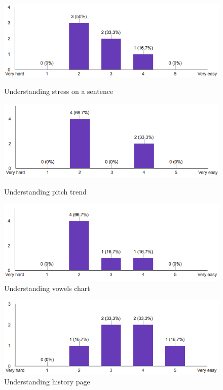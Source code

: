 \begin{figure}[!ht]
	\centering
	\begin{minipage}{.5\textwidth}
		\centering
		\includegraphics[scale=0.5]{Figures/responses/understanding_stress.png}
		\caption{Understanding stress on a sentence}
		\label{fig:int_improving_lang}
	\end{minipage}%
	\begin{minipage}{.5\textwidth}
		\centering
		\includegraphics[scale=0.5]{Figures/responses/understanding_pitch.png}
		\caption{Understanding pitch trend}
		\label{fig:int_learnign_lang}
	\end{minipage}
	\begin{minipage}{.5\textwidth}
		\centering
		\includegraphics[scale=0.5]{Figures/responses/understanding_vowels.png}
		\caption{Understanding vowels chart}
		\label{fig:int_usage_smartphone}
	\end{minipage}%
\end{figure}

\begin{figure}[!ht]
	\centering
	\includegraphics[scale=0.5]{Figures/responses/understanding_history.png}
	\caption{Understanding history page}
	\label{fig:int_improving_lang}
\end{figure}


